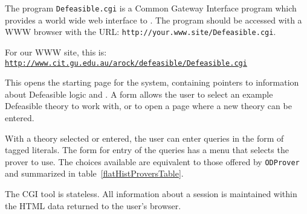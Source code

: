 



   \label{CGIUser}

   The program {\tt Defeasible.cgi} is a Common Gateway
   Interface program which provides a world wide web 
   interface to \deimos. The program should be
   accessed with a WWW browser with the URL:
   {\tt http://your.www.site/Defeasible.cgi}.

   \noindent For our WWW site, this is: \\
   {\tt \href{http://www.cit.gu.edu.au/~arock/defeasible/Defeasible.cgi}{http://www.cit.gu.edu.au/\twiddle arock/defeasible/Defeasible.cgi}}   

   This opens the starting page for the system, containing
   pointers to information about Defeasible logic
   and \deimos. A form allows the user to select an example
   Defeasible theory to work with, or to open a page
   where a new theory can be entered.
   
   With a theory selected or entered, the user can enter
   queries in the form of tagged literals. The form for
   entry of the queries has a menu that selects the prover
   to use. The choices available are equivalent to those
   offered by {\tt ODProver} and summarized
   in table~\ref{flatHistProversTable}.
   
   The CGI tool is stateless. All information about a session
   is maintained within the HTML data returned to the
   user's browser.
   
   
   
   
